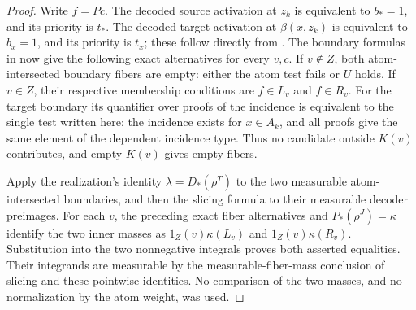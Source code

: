 \begin{proof}
Write $f=Pc$. The decoded source activation at $z_k$ is equivalent to
$b_*=1$, and its priority is $t_*$. The decoded target activation at
$\beta(x,z_k)$ is equivalent to $b_x=1$, and its priority is $t_x$;
these follow directly from
. The boundary formulas
in 
now give the following exact alternatives for every $v,c$.
If $v\notin Z$, both atom-intersected boundary fibers are empty: either
the atom test fails or $U$ holds. If $v\in Z$, their respective membership
conditions are $f\in L_v$ and $f\in R_v$. For the target boundary its
quantifier over proofs of the incidence is equivalent to the single
test written here: the incidence exists for $x\in A_k$, and all proofs
give the same element of the dependent incidence type. Thus no candidate
outside $K(v)$ contributes, and empty $K(v)$ gives empty fibers.

Apply the realization's identity $\lambda=D_*(\rho^T)$ to the two
measurable atom-intersected boundaries, and then the slicing formula to
their measurable decoder preimages. For each $v$, the preceding exact
fiber alternatives and $P_*(\rho^J)=\kappa$ identify the two inner masses
as $1_Z(v)\kappa(L_v)$ and $1_Z(v)\kappa(R_v)$. Substitution into the
two nonnegative integrals proves both asserted equalities. Their
integrands are measurable by the measurable-fiber-mass conclusion of
slicing and these pointwise identities. No comparison of the two
masses, and no normalization by the atom weight, was used.
\end{proof}
